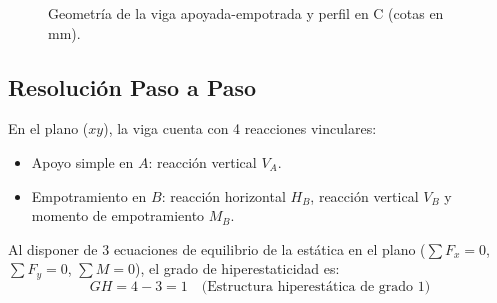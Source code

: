 \begin{figure}[H]
{%
    }
    \caption{Geometría de la viga apoyada-empotrada y perfil en C (cotas en mm).}
    \label{fig:examen_2018_viga_geometria}
\end{figure}

\subsection{Resolución Paso a Paso}


En el plano ($xy$), la viga cuenta con 4 reacciones vinculares:
\begin{itemize}
    \item Apoyo simple en $A$: reacción vertical $V_A$.
    \item Empotramiento en $B$: reacción horizontal $H_B$, reacción vertical $V_B$ y momento de empotramiento $M_B$.
\end{itemize}
Al disponer de 3 ecuaciones de equilibrio de la estática en el plano ($\sum F_x = 0$, $\sum F_y = 0$, $\sum M = 0$), el grado de hiperestaticidad es:
\begin{equation}
    GH = 4 - 3 = 1 \quad \text{(Estructura hiperestática de grado 1)}
\end{equation}

